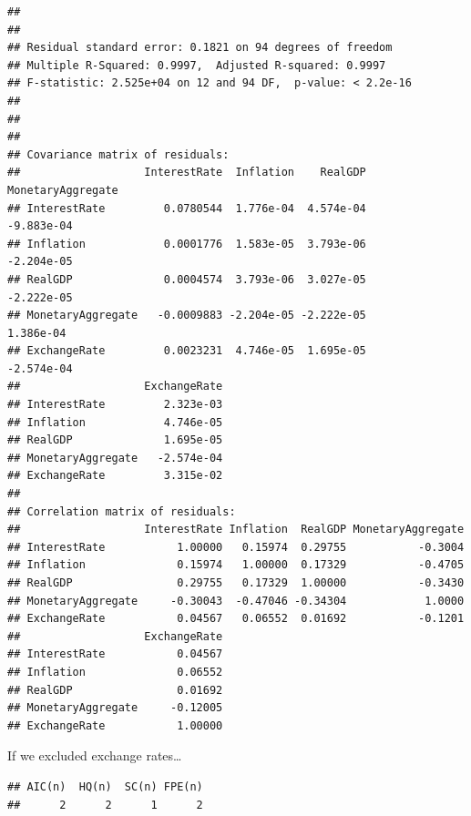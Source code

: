 \documentclass[11pt,preprint, authoryear]{elsarticle}
\numberwithin{equation}{section}
\numberwithin{figure}{section}
\numberwithin{table}{section}
\begin{document}
\begin{verbatim}
## 
## 
## Residual standard error: 0.1821 on 94 degrees of freedom
## Multiple R-Squared: 0.9997,  Adjusted R-squared: 0.9997 
## F-statistic: 2.525e+04 on 12 and 94 DF,  p-value: < 2.2e-16 
## 
## 
## 
## Covariance matrix of residuals:
##                   InterestRate  Inflation    RealGDP MonetaryAggregate
## InterestRate         0.0780544  1.776e-04  4.574e-04        -9.883e-04
## Inflation            0.0001776  1.583e-05  3.793e-06        -2.204e-05
## RealGDP              0.0004574  3.793e-06  3.027e-05        -2.222e-05
## MonetaryAggregate   -0.0009883 -2.204e-05 -2.222e-05         1.386e-04
## ExchangeRate         0.0023231  4.746e-05  1.695e-05        -2.574e-04
##                   ExchangeRate
## InterestRate         2.323e-03
## Inflation            4.746e-05
## RealGDP              1.695e-05
## MonetaryAggregate   -2.574e-04
## ExchangeRate         3.315e-02
## 
## Correlation matrix of residuals:
##                   InterestRate Inflation  RealGDP MonetaryAggregate
## InterestRate           1.00000   0.15974  0.29755           -0.3004
## Inflation              0.15974   1.00000  0.17329           -0.4705
## RealGDP                0.29755   0.17329  1.00000           -0.3430
## MonetaryAggregate     -0.30043  -0.47046 -0.34304            1.0000
## ExchangeRate           0.04567   0.06552  0.01692           -0.1201
##                   ExchangeRate
## InterestRate           0.04567
## Inflation              0.06552
## RealGDP                0.01692
## MonetaryAggregate     -0.12005
## ExchangeRate           1.00000
\end{verbatim}

If we excluded exchange rates\ldots{}

\begin{verbatim}
## AIC(n)  HQ(n)  SC(n) FPE(n) 
##      2      2      1      2
\end{verbatim}
\end{document}
